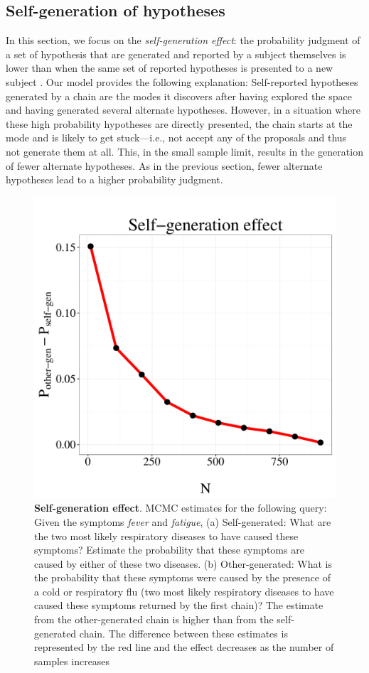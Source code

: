 \subsection{Self-generation of hypotheses}

In this section, we focus on the \emph{self-generation effect}: the probability judgment of a set of hypothesis that are generated and reported by a subject themselves is lower than when the same set of reported hypotheses is presented to a new subject \citep{conf,koriat1980}. Our model provides the following explanation: Self-reported hypotheses generated by a chain are the modes it discovers after having explored the space and having generated several alternate hypotheses. However, in a situation where these high probability hypotheses are directly presented, the chain starts at the mode and is likely to get stuck---i.e., not accept any of the proposals and thus not generate them at all. This, in the small sample limit, results in the generation of fewer alternate hypotheses. As in the previous section, fewer alternate hypotheses lead to a higher probability judgment.

\begin{figure}
\centering
\includegraphics[scale = 0.5]{figures/confidence.pdf}
\caption{\textbf{Self-generation effect}. MCMC estimates for the following query: Given the symptoms \emph{fever} and \emph{fatigue}, (a) Self-generated: What are the two most likely respiratory diseases to have caused these symptoms? Estimate the probability that these symptoms are caused by either of these two diseases. (b) Other-generated: What is the probability that these symptoms were caused by the presence of a cold or respiratory flu (two most likely respiratory diseases to have caused these symptoms returned by the first chain)? The estimate from the other-generated chain is higher than from the self-generated chain. The difference between these estimates is represented by the red line and the effect decreases as the number of samples increases}
\label{fig:conf}
\end{figure}

